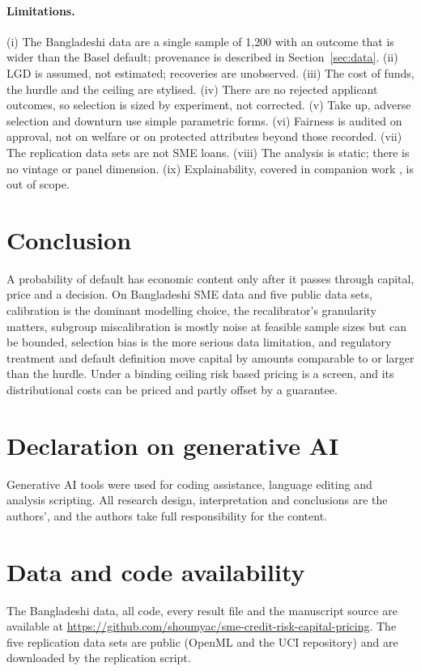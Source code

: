 \documentclass[11pt,a4paper]{article}
\begin{document}
\paragraph{Limitations.} (i) The Bangladeshi data are a single sample of 1{,}200 with an outcome that is wider than the Basel default; provenance is described in Section~\ref{sec:data}. (ii) LGD is assumed, not estimated; recoveries are unobserved. (iii) The cost of funds, the hurdle and the ceiling are stylised. (iv) There are no rejected applicant outcomes, so selection is sized by experiment, not corrected. (v) Take up, adverse selection and downturn use simple parametric forms. (vi) Fairness is audited on approval, not on welfare or on protected attributes beyond those recorded. (vii) The replication data sets are not SME loans. (viii) The analysis is static; there is no vintage or panel dimension. (ix) Explainability, covered in companion work \citep{Companion2026,CompanionFed2026}, is out of scope.

\section{Conclusion}\label{sec:conc}
A probability of default has economic content only after it passes through capital, price and a decision. On Bangladeshi SME data and five public data sets, calibration is the dominant modelling choice, the recalibrator's granularity matters, subgroup miscalibration is mostly noise at feasible sample sizes but can be bounded, selection bias is the more serious data limitation, and regulatory treatment and default definition move capital by amounts comparable to or larger than the hurdle. Under a binding ceiling risk based pricing is a screen, and its distributional costs can be priced and partly offset by a guarantee.

\section*{Declaration on generative AI}
Generative AI tools were used for coding assistance, language editing and analysis scripting. All research design, interpretation and conclusions are the authors', and the authors take full responsibility for the content.

\section*{Data and code availability}
The Bangladeshi data, all code, every result file and the manuscript source are available at \url{https://github.com/shoumyac/sme-credit-risk-capital-pricing}. The five replication data sets are public (OpenML and the UCI repository) and are downloaded by the replication script.


\end{document}
